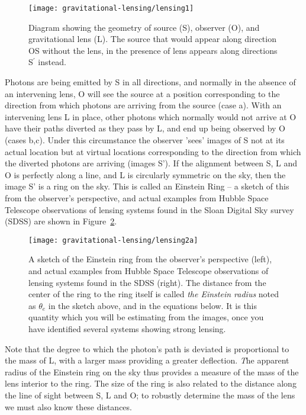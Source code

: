 \begin{figure}
	\begin{center}
		\texttt{[image: gravitational-lensing/lensing1]}
	\end{center}
	\caption{Diagram showing the geometry of source (S), observer (O), and gravitational lens (L). The source that would appear along direction OS without the lens, in the presence of lens appears along directions S$^{\prime}$ instead.}\label{gl:fig:geometry}
\end{figure}

Photons are being emitted by S in all directions, and normally in the
absence of an intervening lens, O will see the source at a position
corresponding to the direction from which photons are arriving from
the source (case a). With an intervening lens L in place, other
photons which normally would not arrive at O have their paths diverted
as they pass by L, and end up being observed by O (cases b,c). Under
this circumstance the observer 'sees' images of S not at its actual
location but at virtual locations corresponding to the direction from
which the diverted photons are arriving (images S').  If the alignment
between S, L and O is perfectly along a line, and L is circularly
symmetric on the sky, then the image S' is a ring on the sky. This is
called an Einstein Ring -- a sketch of this from the observer's
perspective, and actual examples from Hubble Space Telescope
observations of lensing systems found in the Sloan Digital Sky survey (SDSS) are shown in Figure~\ref{gl:fig:rings}.

\begin{figure}
	\centering
	\texttt{[image: gravitational-lensing/lensing2a]}
	\caption{A sketch of the Einstein ring from the observer's perspective
		(left), and actual examples from Hubble Space Telescope observations
		of lensing systems found in the SDSS (right). The distance from the
		center of the ring to the ring itself is called \textit{the Einstein
			radius} noted as $\theta_e$ in the sketch above, and in the equations below. It is this quantity which you will be estimating from the images, once you have identified several systems showing strong lensing.}\label{gl:fig:rings}
\end{figure}

Note that the degree to which the photon's path is deviated is
proportional to the mass of L, with a larger mass providing a greater
deflection. {\emph The apparent radius of the Einstein ring on the sky thus
	provides a measure of the mass of the lens interior to the ring.} The
size of the ring is also related to the distance along the line of
sight between S, L and O; to robustly determine the mass of the lens
we must also know these distances. 

